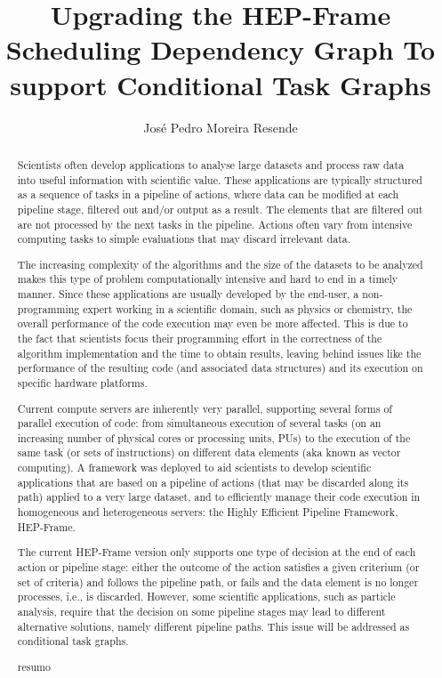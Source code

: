 \documentclass[a4paper, twoside]{report}
\title{Upgrading the HEP-Frame Scheduling Dependency Graph To support Conditional Task Graphs }
\author{José Pedro Moreira Resende}
\begin{document}


\begin{abstract}
Scientists often develop applications to analyse large datasets and process raw data into useful information with scientific value. These applications are typically structured as a sequence of tasks in a pipeline of actions, where data can be modified at each pipeline stage, filtered out and/or output as a result. The elements that are filtered out are not processed by the next tasks in the pipeline. Actions often vary from intensive computing tasks to simple evaluations that may discard irrelevant data.
\par The increasing complexity of the algorithms and the size of the datasets to be analyzed makes this type of problem computationally intensive and hard to end in a timely manner. Since these applications are usually developed by the end-user, a non-programming expert working in a scientific domain, such as physics or chemistry, the overall performance of the code execution may even be more affected. This is due to the fact that scientists focus their programming effort in the correctness of the algorithm implementation and the time to obtain results, leaving behind issues like the performance of the resulting code (and associated data structures) and its execution on specific hardware platforms.
\par Current compute servers are inherently very parallel, supporting several forms of parallel execution of code: from simultaneous execution of several tasks (on an increasing number of physical cores or processing units, PUs) to the execution of the same task (or sets of instructions) on different data elements (aka known as vector computing). A framework was deployed to aid scientists to develop scientific applications that are based on a pipeline of actions (that may be discarded along its path) applied to a very large dataset, and to efficiently manage their code execution in homogeneous and heterogeneous servers: the Highly Efficient Pipeline Framework, HEP-Frame.
\par The current HEP-Frame version only supports one type of decision at the end of each action or pipeline stage: either the outcome of the action satisfies a given criterium (or set of criteria) and follows the pipeline path, or fails and the data element is no longer processes, i.e., is discarded. However, some scientific applications, such as particle analysis, require that the decision on some pipeline stages may lead to different alternative solutions, namely different pipeline paths. This issue will be addressed as conditional task graphs.

\end{abstract}

\renewcommand{\abstractname}{Resumo}
\begin{abstract}
  resumo
\end{abstract}


\clearpage %

\tableofcontents
\listoffigures
\listoftables





\end{document}
